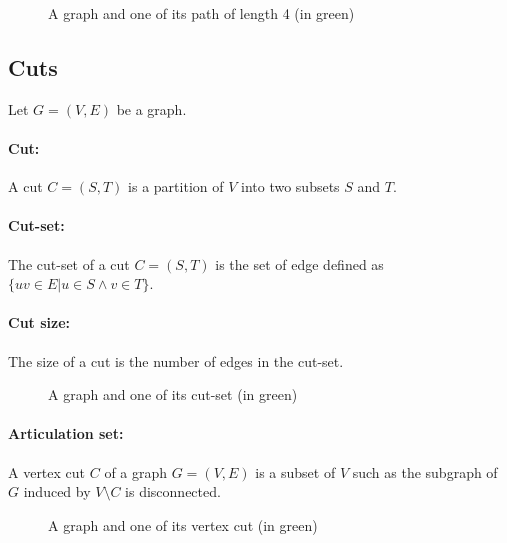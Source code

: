 \begin{figure}[!h]
  \begin{center}
    
  \end{center}
  \caption{A graph and one of its path of length 4 (in green)}
\end{figure}

\subsection{Cuts}
Let $G=(V,E)$ be a graph.
\paragraph{Cut:}
A cut $C=(S,T)$ is a partition of $V$ into two subsets $S$ and $T$.

\paragraph{Cut-set:}
The cut-set of a cut $C=(S,T)$ is the set of edge defined as $\{uv \in E | u \in S \wedge v \in T\}$.

\paragraph{Cut size:}
The size of a cut is the number of edges in the cut-set.

\begin{figure}[!h]
  \begin{center}
    
  \end{center}
  \caption{A graph and one of its cut-set (in green)}
\end{figure}


\paragraph{Articulation set:}
A vertex cut $C$ of a graph $G=(V,E)$ is a subset of $V$ such as the subgraph
of $G$ induced by $V \setminus C$ is disconnected.

\begin{figure}[!h]
  \begin{center}
    
  \end{center}
  \caption{A graph and one of its vertex cut (in green)}
\end{figure}

